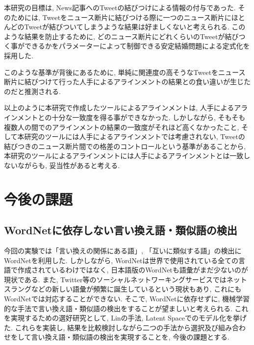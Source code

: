 \documentclass[12pt]{jarticle}
\begin{document}
本研究の目標は, News記事へのTweetの結びつけによる情報の付与であった.
そのためには, Tweetをニュース断片に結びつける際に一つのニュース断片にほとんどのTweetが結びついてしまうような結果は好ましくないと考えられる.
このような結果を防止するために, どのニュース断片にどれくらいのTweetが結びつく事ができるかをパラメーターによって制御できる安定結婚問題による定式化を採用した.

このような基準が背後にあるために, 単純に関連度の高そうなTweetをニュース断片に結びつけて行った人手によるアラインメントの結果との食い違いが生じたのだと推測される.


以上のように本研究で作成したツールによるアラインメントは, 人手によるアラインメントとの十分な一致度を得る事ができなかった.
しかしながら, そもそも複数人の間でのアラインメントの結果の一致度がそれほど高くなかったこと, そして本研究のツールには人手によるアラインメントでは考慮されない, Tweetの結びつきのニュース断片間での格差のコントロールという基準があることから, 本研究のツールによるアラインメントには人手によるアラインメントとは一致しないながらも, 妥当性があると考える.

\clearpage
\section{今後の課題}
\subsection{WordNetに依存しない言い換え語・類似語の検出}
今回の実験では「言い換えの関係にある語」, 「互いに類似する語」の検出にWordNetを利用した. しかしながら, WordNetは世界で使用されている全ての言語で作成されているわけではなく, 日本語版のWordNetも語彙がまだ少ないのが現状である. また, Twitter等のソーシャルネットワーキングサービスではネットスラングなどの新しい語彙が頻繁に誕生しているという現状もあり, これにもWordNetでは対応することができない. そこで, WordNetに依存せずに, 機械学習的な手法で言い換え語・類似語の検出をすることが望ましいと考えられる. これを実現するための選好研究として, Linの手法\cite{DekangLin}, Latent Spaceでのモデル化\cite{LatentSpace}を挙げた. これらを実装し, 結果を比較検討しながら二つの手法から選択及び組み合わせをして言い換え語・類似語の検出を実現することを, 今後の課題とする.
\end{document}
